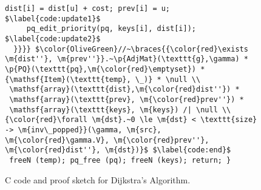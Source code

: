 \begin{figure}[t]
\begin{lstlisting}[mathescape=true,showlines=true]
     dist[i] = dist[u] + cost; prev[i] = u; $\label{code:update1}$ 
     pq_edit_priority(pq, keys[i], dist[i]); $\label{code:update2}$
  }}}} $\color{OliveGreen}//~\braces{{\color{red}\exists \m{dist''}, \m{prev''}}.~\p{AdjMat}(\texttt{g},\gamma) * \p{PQ}(\texttt{pq},\m{\color{red}\emptyset}) * {\mathsf{Item}(\texttt{temp}, \_)} * \null \\
 \mathsf{array}(\texttt{dist},\m{\color{red}dist''}) * 
 \mathsf{array}(\texttt{prev}, \m{\color{red}prev''}) *
 \mathsf{array}(\texttt{keys}, \m{keys}) /| \null \\
{\color{red}\forall \m{dst}.~0 \le \m{dst} < \texttt{size} -> \m{inv\_popped}}(\gamma, \m{src}, \m{\color{red}\gamma.V}, \m{\color{red}prev''}, \m{\color{red}dist''}, \m{dst})}$ $\label{code:end}$
 freeN (temp); pq_free (pq); freeN (keys); return; }
\end{lstlisting}
\vspace{-1em}
\caption{C code and proof sketch for Dijkstra's Algorithm.}
\vspace{-1em}
\label{fig:decorated}
\end{figure} 



